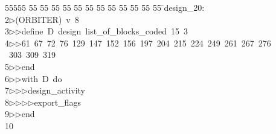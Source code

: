 %
%
\begin{tabbing}
55555 \= 55 \= 55 \= 55 \= 55 \= 55 \= 55 \= 55 \= 55 \= 55 \= 55 \= 55 \= 55 \= \>design\_20:\\[0pt]
2\>$\triangleright$\>(ORBITER)\ v\ 8\ \\[0pt]
3\>$\triangleright$\>$\triangleright$\>define\ D\ design\ list\_of\_blocks\_coded\ 15\ 3\ \\[0pt]
4\>$\triangleright$\>$\triangleright$\>61\ 67\ 72\ 76\ 129\ 147\ 152\ 156\ 197\ 204\ 215\ 224\ 249\ 261\ 267\ 276\ \\[0pt]
\ 303\ 309\ 319\ \\[0pt]
5\>$\triangleright$\>$\triangleright$\>end\ \\[0pt]
6\>$\triangleright$\>$\triangleright$\>with\ D\ do\ \\[0pt]
7\>$\triangleright$\>$\triangleright$\>$\triangleright$\>design\_activity\ \\[0pt]
8\>$\triangleright$\>$\triangleright$\>$\triangleright$\>$\triangleright$\>export\_flags\ \\[0pt]
9\>$\triangleright$\>$\triangleright$\>end\\[0pt]
10\>\end{tabbing}
